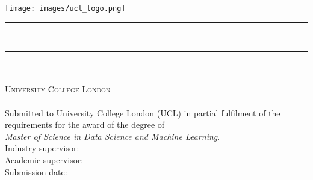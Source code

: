 \begin{singlespace}
    \begin{titlepage}
        \center{}
        \texttt{[image: images/ucl\_logo.png]} \vspace{0.5cm}

        \rule{\linewidth}{0.5mm} \\[0.5cm]
            { \begin{spacing}{1}
            	\HUGE \textsc{\thesisTitle}
              \end{spacing}}
        \rule{\linewidth}{0.5mm} \\[1cm]
		

        \huge \textbf{\textsc{\authorName}}\\
        \textsc{\LARGE University College London}\\
        \textsc{\LARGE \department}\\[2cm]

        {\Large Submitted to University College London (UCL) in partial fulfilment of the requirements for the award of the degree of \\ \textit{Master of Science in Data Science and Machine Learning}.}\\[2cm]

        {\Large Industry supervisor: \primarySupervisor}\\
        {\Large Academic supervisor: \secondarySupervisor}\\[2cm]

        {\Large Submission date: \submissionDate}
        
    \end{titlepage}
\end{singlespace}

%

